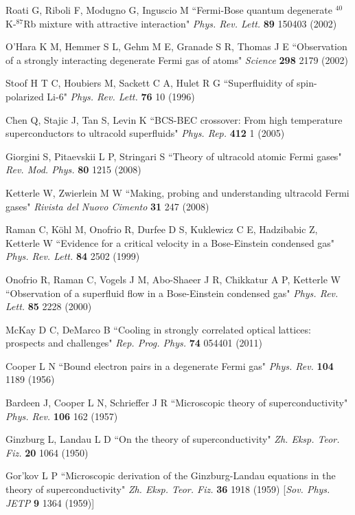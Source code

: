 \documentclass[pra,letterpaper,twocolumn,showpacs,superscriptaddress]{revtex4}
\begin{document}
\begin{thebibliography}{300}
 Roati G, Riboli F, Modugno G, Inguscio M
``Fermi-Bose quantum degenerate $^{40}$K-$^{87}$Rb mixture with attractive interaction"
{\it Phys. Rev. Lett.} \textbf{89} 150403 (2002)

 O'Hara K M, Hemmer S L, Gehm M E, Granade S R, Thomas J E
``Observation of a strongly interacting degenerate Fermi gas of atoms"
{\it Science} \textbf{298} 2179 (2002)

 Stoof H T C, Houbiers M, Sackett C A, Hulet R G 
``Superfluidity of spin-polarized Li-6" {\it Phys. Rev. Lett.} \textbf{76} 10 (1996)

 Chen Q, Stajic J, Tan S, Levin K 
``BCS-BEC crossover: From high temperature superconductors to ultracold superfluids" {\it Phys. Rep.} \textbf{412} 1 (2005)

 Giorgini S, Pitaevskii L P, Stringari S
``Theory of ultracold atomic Fermi gases" {\it Rev. Mod. Phys.} \textbf{80} 1215 (2008) 

 Ketterle W, Zwierlein M W ``Making, probing and understanding ultracold Fermi gases"
{\it Rivista del Nuovo Cimento} \textbf{31} 247 (2008)

 Raman C, K\"ohl M, Onofrio R, Durfee D S, Kuklewicz C E, Hadzibabic Z, Ketterle W 
``Evidence for a critical velocity in a Bose-Einstein condensed gas"
{\it Phys. Rev. Lett.} \textbf{84} 2502 (1999)

 Onofrio R, Raman C, Vogels J M, Abo-Shaeer J R, Chikkatur A P, Ketterle W 
``Observation of a superfluid flow in a Bose-Einstein condensed gas" 
{\it Phys. Rev. Lett.} \textbf{85} 2228 (2000)

 McKay D C, DeMarco B ``Cooling in strongly correlated optical lattices: prospects and challenges"
{\it Rep. Prog. Phys.} \textbf{74} 054401 (2011)

 Cooper L N ``Bound electron pairs in a degenerate Fermi gas" {\it Phys. Rev.} \textbf{104} 1189 (1956)

 Bardeen J, Cooper L N, Schrieffer J R ``Microscopic theory of superconductivity" {\it Phys. Rev.} \textbf{106} 162 (1957) 

 Ginzburg L, Landau L D ``On the theory of superconductivity" {\it Zh. Eksp. Teor. Fiz.} \textbf{20} 1064 (1950)

 Gor'kov L P ``Microscopic derivation of the Ginzburg-Landau equations in the theory of superconductivity"
{\it Zh. Eksp. Teor. Fiz.} \textbf{36} 1918 (1959)
[{\it Sov. Phys. JETP} \textbf{9} 1364 (1959)]


\end{thebibliography}
\end{document}
